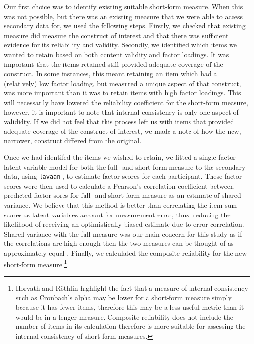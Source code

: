 \documentclass[a4paper,]{book}
\begin{document}
Our first choice was to identify existing suitable short-form measure. When this was not possible, but there was an existing measure that we were able to access secondary data for, we used the following steps. Firstly, we checked that existing measure did measure the construct of interest and that there was sufficient evidence for its reliability and validity. Secondly, we identified which items we wanted to retain based on both content validity and factor loadings. It was important that the items retained still provided adequate coverage of the construct. In some instances, this meant retaining an item which had a (relatively) low factor loading, but measured a unique aspect of that construct, was more important than it was to retain items with high factor loadings. This will necessarily have lowered the reliability coefficient for the short-form measure, however, it is important to note that internal consistency is only one aspect of valididty. If we did not feel that this process left us with items that provided adequate coverage of the construct of interest, we made a note of how the new, narrower, construct differed from the original.

Once we had identifed the items we wished to retain, we fitted a single factor latent variable model for both the full- and short-form measure to the secondary data, using \texttt{lavaan} \citep{R-lavaan}, to estimate factor scores for each participant. These factor scores were then used to calculate a Pearson's correlation coefficient between predicted factor sores for full- and short-form measure as an estimate of shared variance. We believe that this method is better than correlating the item sum-scores as latent variables account for measurement error, thus, reducing the likelihood of receiving an optimistically biased estimate due to error correlation. Shared variance with the full measure was our main concern for this study as if the correlations are high enough then the two measures can be thought of as approximately equal \citep{Smith2000}. Finally, we calculated the composite reliability for the new short-form measure \citep[\(\omega\);][]{Fornell1981}\footnote{Horvath and Röthlin \citeyearpar{Horvath2018} highlight the fact that a measure of internal consistency such as Cronbach's alpha may be lower for a short-form measure simply because it has fewer items, therefore this may be a less useful metric than it would be in a longer measure. Composite reliability does not include the number of items in its calculation therefore is more suitable for assessing the internal consistency of short-form measures.}.
\end{document}

